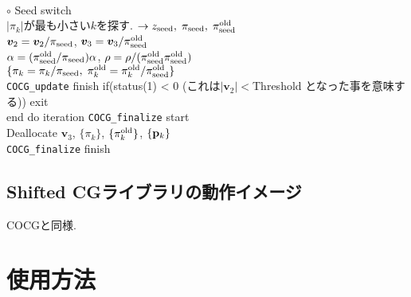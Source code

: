 \documentclass[12pt,titlepage]{jarticle}
\renewenvironment{leftbar}{%
  \def\FrameCommand{\vrule width 1pt \hspace{0pt}}%
  \MakeFramed {\advance\hsize-\width \FrameRestore}}%
 {\endMakeFramed}
\begin{document}
\begin{leftbar}
  \\\hspace{1.0cm}
  $\circ$ Seed switch
  \\\hspace{1.0cm}
  $|\pi_k|$が最も小さい$k$を探す. 
  $\rightarrow z_{\rm seed},\; \pi_{\rm seed},\; \pi_{\rm seed}^{\rm old} $
  \\\hspace{1.0cm}
  ${\boldsymbol v}_2 = {\boldsymbol v}_2 / \pi_{\rm seed}$,
  ${\boldsymbol v}_3 = {\boldsymbol v}_3 / \pi_{\rm seed}^{\rm old}$
  \\\hspace{1.0cm}
  $\alpha = (\pi_{\rm seed}^{\rm old} / \pi_{\rm seed}) \alpha$,
  $\rho = \rho / (\pi_{\rm seed}^{\rm old} \pi_{\rm seed}^{\rm old})$
  \\\hspace{1.0cm}
  $\{\pi_k = \pi_k / \pi_{\rm seed},\; \pi_k^{\rm old} = \pi_k^{\rm old} / \pi_{\rm seed}^{\rm old}\}$
  \\\hspace{0.5cm}
  \verb|COCG_update| finish
\end{leftbar}
\vspace{-1em}
\noindent
\hspace{0.5cm}
if(status(1) < 0 (これは$|{\boldsymbol v}_2| < $Threshold となった事を意味する)) exit
\\
end do iteration
\vspace{-1em}
\begin{leftbar}
  \noindent
  \verb|COCG_finalize| start
  \\ \hspace{0.5cm}
  Deallocate ${\boldsymbol v}_3$, $\{\pi_k\}$, $\{\pi_k^{\rm old}\}$, $\{{\bf p}_k\}$
  \\
  \verb|COCG_finalize| finish
\end{leftbar}
\vspace{-1em}

\subsection{Shifted CGライブラリの動作イメージ}

COCGと同様.

\section{使用方法}
\end{document}
